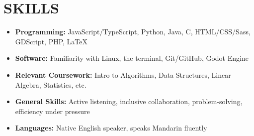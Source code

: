 \documentclass[letterpaper,10pt]{extarticle}
\begin{document}

\section*{SKILLS}
\begin{itemize}
    \item \textbf{Programming:} JavaScript/TypeScript, Python, Java, C, HTML/CSS/Sass, GDScript, PHP, \LaTeX
    \item \textbf{Software:} Familiarity with Linux, the terminal, Git/GitHub, Godot Engine
    \item \textbf{Relevant Coursework:} Intro to Algorithms, Data Structures, Linear Algebra, Statistics, etc.
    \item \textbf{General Skills:} Active listening, inclusive collaboration, problem-solving, efficiency under pressure
    \item \textbf{Languages:} Native English speaker, speaks Mandarin fluently
\end{itemize}

\end{document}
